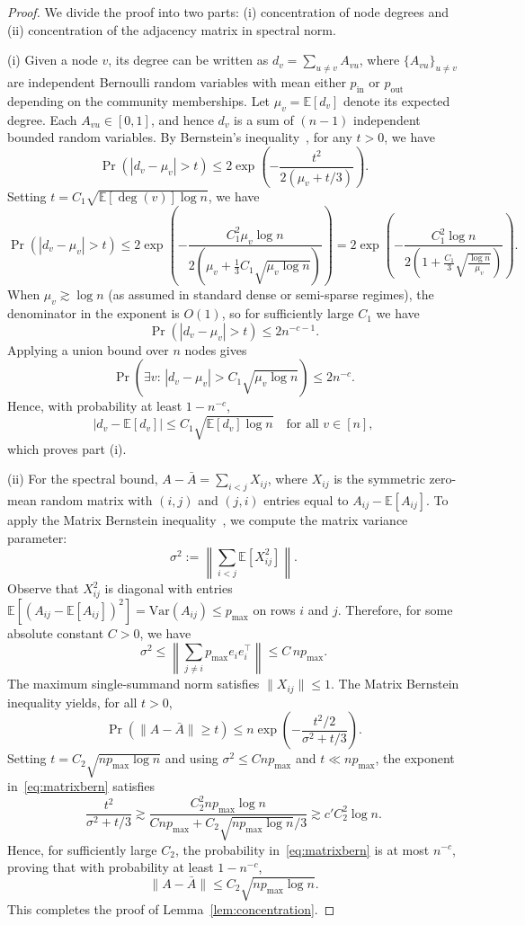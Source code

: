 \documentclass[11pt,english]{article}
\begin{document}
\begin{proof}
We divide the proof into two parts: (i) concentration of node degrees and (ii) concentration of the adjacency matrix in spectral norm.

\noindent(i) Given a node $v$, its degree can be written as $d_v = \sum_{u\neq v} A_{vu}$, where $\{A_{vu}\}_{u\neq v}$ are independent Bernoulli random variables with mean either $p_{\mathrm{in}}$ or $p_{\mathrm{out}}$ depending on the community memberships. Let $\mu_v = \mathbb{E}[d_v]$ denote its expected degree. Each $A_{vu}\in[0,1]$, and hence $d_v$ is a sum of $(n-1)$ independent bounded random variables.
By Bernstein’s inequality~\parencite{govil1987bernstein}, for any $t>0$, we have
\[
    \Pr(|d_v - \mu_v| > t)
    \le 2\exp\!\left(-\frac{t^2}{2(\mu_v+t/3)}\right).
\]
Setting $t=C_1\sqrt{\mathbb{E}[ \deg(v) ]\log n}$, we have 
\[
    \Pr(|d_v - \mu_v| > t) \le 2\exp\!\left(-\frac{C_1^2 \mu_v \log n}{2(\mu_v + \tfrac{1}{3}C_1\sqrt{\mu_v\log n})} \right) =
    2\exp\!\left( -\frac{C_1^2\log n}{2(1 + \tfrac{C_1}{3}\sqrt{\tfrac{\log n}{\mu_v}})} \right).
\]
When $\mu_v \gtrsim \log n$ (as assumed in standard dense or semi-sparse regimes), the denominator in the exponent is $O(1)$, so for sufficiently large $C_1$ we have
\[
    \Pr(|d_v - \mu_v| > t) \le 2n^{-c-1}.
\]
\noindent Applying a union bound over $n$ nodes gives
\[
    \Pr\! \left(\exists v:\, |d_v - \mu_v| > C_1\sqrt{\mu_v\log n}\right) \le 2n^{-c}.
\]
Hence, with probability at least $1-n^{-c}$,
\[
    |d_v-\mathbb E[d_v]| \le C_1\sqrt{\mathbb E[d_v]\log n} \quad\text{for all }v\in[n],
\]
which proves part (i).



\noindent(ii) For the spectral bound, $A-\bar A=\sum_{i<j} X_{ij}$, where $X_{ij}$ is the symmetric zero-mean random matrix with $(i,j)$ and $(j,i)$ entries equal to $A_{ij}-\mathbb{E}[A_{ij}]$. To apply the Matrix Bernstein inequality~\parencite{tropp2012user}, we compute the matrix variance parameter:
\[
    \sigma^2 := \left\|\sum_{i<j}\mathbb E[X_{ij}^2]\right\|.
\]
Observe that $X_{ij}^2$ is diagonal with entries 
$\mathbb E[(A_{ij}-\mathbb E[A_{ij}])^2] = \mathrm{Var}(A_{ij}) \le p_{\max}$ 
on rows $i$ and $j$. Therefore, for some absolute constant $C>0$, we have
\[
    \sigma^2 \le \left\| \sum_{j\neq i} p_{\max} e_i e_i^\top \right\| \le  C\,n p_{\max}.
\] 
The maximum single-summand norm satisfies $\|X_{ij}\|\le 1$.  The Matrix Bernstein inequality yields, for all $t>0$,
\begin{equation}
    \Pr(\|A-\bar A\| \ge t) \le  n \exp\!\left(-\frac{t^2/2}{\sigma^2 + t/3} \right).
    \label{eq:matrixbern}
\end{equation}
Setting $t = C_2\sqrt{n p_{\max}\log n} $ and using $\sigma^2 \le C n p_{\max}$ and $t\ll n p_{\max}$, the exponent in~\eqref{eq:matrixbern} satisfies
\[
\frac{t^2}{\sigma^2 + t/3}
\gtrsim
\frac{C_2^2 n p_{\max} \log n}{C n p_{\max} + C_2\sqrt{n p_{\max}\log n}/3}
\gtrsim c' C_2^2 \log n.
\]
Hence, for sufficiently large $C_2$, the probability in~\eqref{eq:matrixbern} is at most $n^{-c}$, proving that with probability at least $1-n^{-c}$,
\[
\|A-\bar A\| \le C_2\sqrt{n p_{\max}\log n}.
\]\noindent 
This completes the proof of Lemma~\ref{lem:concentration}.
\end{proof}
\end{document}
